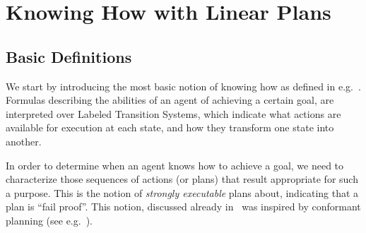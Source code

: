 \section{Knowing How with Linear Plans}
\label{sec:khlinearplans}

\subsection{Basic Definitions}

We start by introducing the most basic notion of knowing how as defined in e.g.~\cite{Wang15lori,Wang16,Wang2016}. Formulas describing the abilities of an agent of achieving a certain goal, are interpreted over Labeled Transition Systems, which indicate what actions are available for execution at each state, and how they transform one state into another.


In order to determine when an agent knows how to achieve a goal, we need to characterize those sequences of actions (or plans) that result appropriate for such a purpose. This is the notion of \emph{strongly executable} plans about, indicating that a plan is ``fail proof''. This notion, discussed already in~\cite{Wang15lori,Wang16,Wang2016} was inspired by conformant planning (see e.g.~\cite{Smith&Weld98,Bonet2010}).


